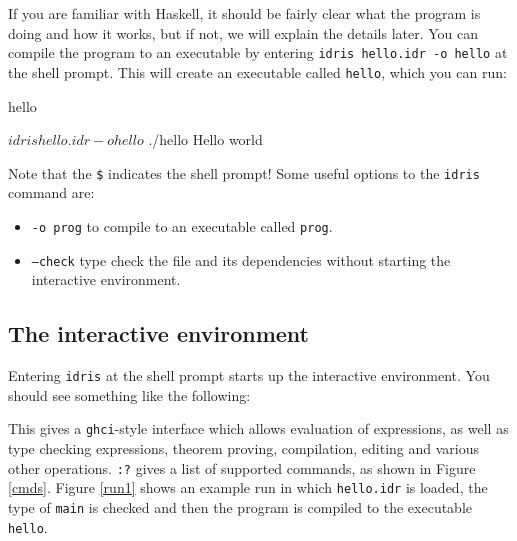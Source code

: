 \noindent
If you are familiar with Haskell, it should be fairly clear what the program is doing
and how it works, but if not, we will explain the details later.
You can compile the program to an executable by entering \texttt{idris hello.idr -o hello}
at the shell prompt. This will create an executable called \texttt{hello}, which you can run:

\begin{SaveVerbatim}{hello}

$ idris hello.idr -o hello
$ ./hello
Hello world

\end{SaveVerbatim}

\noindent
Note that the \texttt{\$} indicates the shell prompt! Some useful options to the
\texttt{idris} command are:

\begin{itemize}
\item \texttt{-o prog} to compile to an executable called \texttt{prog}.
\item \texttt{--check} type check the file and its dependencies without starting the 
interactive environment.
\end{itemize}

\subsection{The interactive environment}

Entering \texttt{idris} at the shell prompt starts up the interactive
environment. You should see something like the following:



\noindent
This gives a \texttt{ghci}-style interface which allows evaluation of expressions,
as well as type checking expressions, theorem proving, compilation, editing
and various other operations. \texttt{:?} gives a list of supported commands,
as shown in Figure \ref{cmds}. Figure \ref{run1} shows an example run in which
\texttt{hello.idr} is loaded, the type of \texttt{main} is checked and then
the program is compiled to the executable \texttt{hello}.

